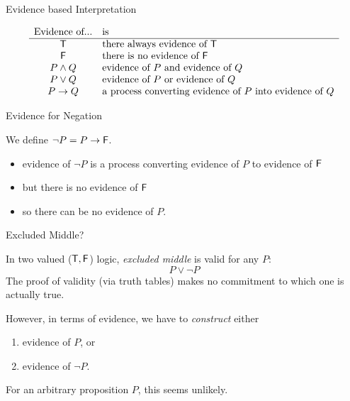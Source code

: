 \documentclass[xetex,aspectratio=169,14pt,hyperref={pdfpagelabels=true,pdflang={en-GB}}]{beamer}
\begin{document}
\begin{frame}
  {Evidence based Interpretation}

  \begin{displaymath}
    \begin{array}{cl}
      \textrm{Evidence of...}&\textrm{is}\\
      \hline
      \mathsf{T} &\textrm{there always evidence of $\mathsf{T}$} \\
      \mathsf{F}&\textrm{there is no evidence of $\mathsf{F}$} \\
      P \land Q&\textrm{evidence of $P$ and evidence of $Q$} \\
      P \lor Q &\textrm{evidence of $P$ or  evidence of $Q$} \\
      P \to Q  &\textrm{a process converting evidence of $P$ into evidence of $Q$}
    \end{array}
  \end{displaymath}
\end{frame}

\begin{frame}
  {Evidence for Negation}

  We define $\lnot P = P \to \mathsf{F}$.
  \begin{itemize}
  \item evidence of $\lnot P$ is a process converting evidence of $P$ to evidence of $\mathsf{F}$
  \item but there is no evidence of $\mathsf{F}$
  \item so there can be no evidence of $P$.
  \end{itemize}
\end{frame}

\begin{frame}
  {Excluded Middle?}

  In two valued ($\mathsf{T}, \mathsf{F}$) logic, \emph{excluded middle} is valid for any $P$:
  \begin{displaymath}
    P \lor \lnot P
  \end{displaymath}
  The proof of validity (via truth tables) makes no commitment to
  which one is actually true.

  \pause
  \bigskip

  However, in terms of evidence, we have to \emph{construct} either
  \begin{enumerate}
  \item evidence of $P$, or
  \item evidence of $\lnot P$.
  \end{enumerate}
  For an arbitrary proposition $P$, this seems unlikely.
\end{frame}
\end{document}
